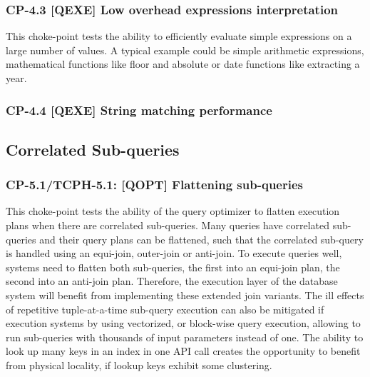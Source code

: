 \subsubsection{CP-4.3 [QEXE] Low overhead expressions interpretation}
\label{choke_point_4.3}
This choke-point tests the ability to efficiently evaluate simple expressions on a large number of values. A typical example could be simple arithmetic expressions, mathematical functions like floor and absolute or date functions like extracting a year.

\subsubsection{CP-4.4 [QEXE] String matching performance}




\subsection{Correlated Sub-queries}

\subsubsection{CP-5.1/TCPH-5.1: [QOPT]  Flattening sub-queries}
\label{choke_point_5.1}
This choke-point tests the ability of the query optimizer to flatten execution plans when there are correlated sub-queries. Many queries have correlated sub-queries and their query plans can be flattened,
such that the correlated sub-query is handled using an equi-join, outer-join or anti-join. To execute queries well, systems need to flatten both sub-queries, the first into an equi-join plan, the second into an anti-join plan.
Therefore, the execution layer of the database system will benefit from implementing these extended join variants.
The ill effects of repetitive tuple-at-a-time sub-query execution can also be mitigated if execution systems by using vectorized, or block-wise query execution, allowing to run sub-queries with thousands of input parameters instead of one.
The ability to look up many keys in an index in one API call creates the opportunity to benefit from physical locality, if lookup keys exhibit some clustering.

